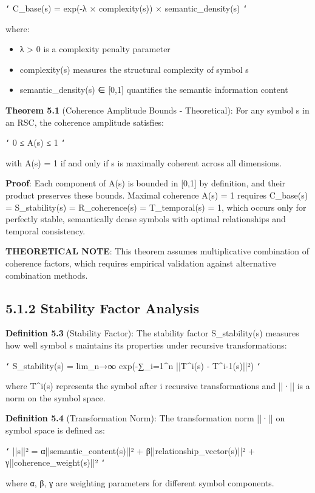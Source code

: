 \texttt{`}
C_base(s) = exp(-λ × complexity(s)) × semantic_density(s)
\texttt{`}

where:
\begin{itemize}
\item λ > 0 is a complexity penalty parameter
\item complexity(s) measures the structural complexity of symbol s
\item semantic_density(s) ∈ [0,1] quantifies the semantic information content
\end{itemize}

\textbf{Theorem 5.1} (Coherence Amplitude Bounds - Theoretical): For any symbol s in an RSC, the coherence amplitude satisfies:

\texttt{`}
0 ≤ A(s) ≤ 1
\texttt{`}

with A(s) = 1 if and only if s is maximally coherent across all dimensions.

\textbf{Proof}: Each component of A(s) is bounded in [0,1] by definition, and their product preserves these bounds. Maximal coherence A(s) = 1 requires C_base(s) = S_stability(s) = R_coherence(s) = T_temporal(s) = 1, which occurs only for perfectly stable, semantically dense symbols with optimal relationships and temporal consistency.

\textbf{THEORETICAL NOTE}: This theorem assumes multiplicative combination of coherence factors, which requires empirical validation against alternative combination methods.

\subsection{5.1.2 Stability Factor Analysis}

\textbf{Definition 5.3} (Stability Factor): The stability factor S_stability(s) measures how well symbol s maintains its properties under recursive transformations:

\texttt{`}
S_stability(s) = lim_{n→∞} exp(-∑_{i=1}^n ||T^i(s) - T^{i-1}(s)||²)
\texttt{`}

where T^i(s) represents the symbol after i recursive transformations and ||·|| is a norm on the symbol space.

\textbf{Definition 5.4} (Transformation Norm): The transformation norm ||·|| on symbol space is defined as:

\texttt{`}
||s||² = α||semantic_content(s)||² + β||relationship_vector(s)||² + γ||coherence_weight(s)||²
\texttt{`}

where α, β, γ are weighting parameters for different symbol components.

